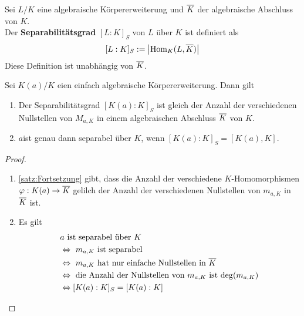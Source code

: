 	\begin{definition}
		Sei $L/K$ eine algebraische Körpererweiterung und $\overline{K}$ der algebraische Abschluss von $K$.\\
		Der \textbf{Separabilitätsgrad} $[L:K]_S$ von $L$ über $K$ ist definiert als
		\[[L:K]_S:=\left|\operatorname{Hom}_K(L,\overline{K})\right|\]
		Diese Definition ist unabhängig von $\overline{K}$.
	\end{definition}

	\begin{satz}
		Sei $K(a)/K$ eien einfach algebraische Körpererweiterung. Dann gilt
		\begin{enumerate}
			\item Der Separabilitätsgrad $[K(a):K]_S$ ist gleich der Anzahl der verschiedenen Nullstellen von $M_{a,K}$ in einem algebraischen Abschluss $\overline{K}$ von $K$.
			\item $a$ist genau dann separabel über $K$, wenn $[K(a):K]_S=[K(a),K]$.
		\end{enumerate}
	\end{satz}
	\begin{proof}
		\begin{enumerate}
			\item \ref{satz:Fortsetzung} gibt, dass die Anzahl der verschiedene $K$-Homomorphismen $\varphi:K(a)\to\overline{K}$ gelilch der Anzahl der verschiedenen Nullstellen von $m_{a,K}$ in $\overline{K}$ ist.
			\item Es gilt
			\begin{align*}
			&\text{$a$ ist separabel über $K$ }\\
			&\Leftrightarrow \text{ $m_{a,K}$ ist separabel }\\
			&\Leftrightarrow\text{ $m_{a,K}$ hat nur einfache Nullstellen in $\overline{K}$ }\\
			&\Leftrightarrow\text{ die Anzahl der Nullstellen von $m_{a,K}$ ist $\deg(m_{a,K})$}\\
			&\Leftrightarrow [K(a):K]_S=[K(a):K]
			\end{align*}
		\end{enumerate}
	\end{proof}

